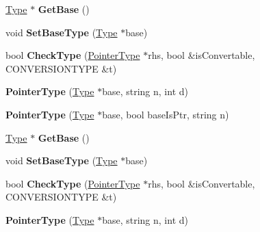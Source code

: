 \begin{DoxyCompactItemize}
\item 
\hypertarget{classPointerType_acfdee349a0e18abd304f85d0b6d951ff}{\hyperlink{classType}{Type} $\ast$ {\bfseries Get\-Base} ()}\label{classPointerType_acfdee349a0e18abd304f85d0b6d951ff}

\item 
\hypertarget{classPointerType_abfb4082aafcedbe8660cfadabbe79f18}{void {\bfseries Set\-Base\-Type} (\hyperlink{classType}{Type} $\ast$base)}\label{classPointerType_abfb4082aafcedbe8660cfadabbe79f18}

\item 
\hypertarget{classPointerType_a01b7271726a3f891c9556cbbab3a4410}{bool {\bfseries Check\-Type} (\hyperlink{classPointerType}{Pointer\-Type} $\ast$rhs, bool \&is\-Convertable, C\-O\-N\-V\-E\-R\-S\-I\-O\-N\-T\-Y\-P\-E \&t)}\label{classPointerType_a01b7271726a3f891c9556cbbab3a4410}

\item 
\hypertarget{classPointerType_acb7c1bf4a82371e46d133a1471d1e3f3}{{\bfseries Pointer\-Type} (\hyperlink{classType}{Type} $\ast$base, string n, int d)}\label{classPointerType_acb7c1bf4a82371e46d133a1471d1e3f3}

\item 
\hypertarget{classPointerType_a58dbecb35ecd7ba2901db09aba00dcc7}{{\bfseries Pointer\-Type} (\hyperlink{classType}{Type} $\ast$base, bool base\-Is\-Ptr, string n)}\label{classPointerType_a58dbecb35ecd7ba2901db09aba00dcc7}

\item 
\hypertarget{classPointerType_acfdee349a0e18abd304f85d0b6d951ff}{\hyperlink{classType}{Type} $\ast$ {\bfseries Get\-Base} ()}\label{classPointerType_acfdee349a0e18abd304f85d0b6d951ff}

\item 
\hypertarget{classPointerType_abfb4082aafcedbe8660cfadabbe79f18}{void {\bfseries Set\-Base\-Type} (\hyperlink{classType}{Type} $\ast$base)}\label{classPointerType_abfb4082aafcedbe8660cfadabbe79f18}

\item 
\hypertarget{classPointerType_a01b7271726a3f891c9556cbbab3a4410}{bool {\bfseries Check\-Type} (\hyperlink{classPointerType}{Pointer\-Type} $\ast$rhs, bool \&is\-Convertable, C\-O\-N\-V\-E\-R\-S\-I\-O\-N\-T\-Y\-P\-E \&t)}\label{classPointerType_a01b7271726a3f891c9556cbbab3a4410}

\item 
\hypertarget{classPointerType_acb7c1bf4a82371e46d133a1471d1e3f3}{{\bfseries Pointer\-Type} (\hyperlink{classType}{Type} $\ast$base, string n, int d)}\label{classPointerType_acb7c1bf4a82371e46d133a1471d1e3f3}


\end{DoxyCompactItemize}
